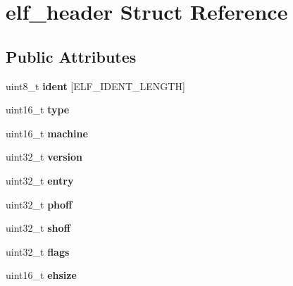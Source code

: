 \hypertarget{structelf__header}{}\section{elf\+\_\+header Struct Reference}
\label{structelf__header}
\subsection*{Public Attributes}
\begin{DoxyCompactItemize}
\item 
\mbox{\label{structelf__header_aa62466724f7e6fb4794f1863f15595bb}} 
uint8\+\_\+t {\bfseries ident} \mbox{[}E\+L\+F\+\_\+\+I\+D\+E\+N\+T\+\_\+\+L\+E\+N\+G\+TH\mbox{]}
\item 
\mbox{\label{structelf__header_a6af0b35d508659d27f60d21821cfb6da}} 
uint16\+\_\+t {\bfseries type}
\item 
\mbox{\label{structelf__header_a7bc34a70eaa449a330edfeef0d5708ce}} 
uint16\+\_\+t {\bfseries machine}
\item 
\mbox{\label{structelf__header_a8bd4439963c52b6f1fda03ca00c3c1b4}} 
uint32\+\_\+t {\bfseries version}
\item 
\mbox{\label{structelf__header_abb5285fc4a3d3c57636f46aa570a2444}} 
uint32\+\_\+t {\bfseries entry}
\item 
\mbox{\label{structelf__header_aa1a016e031867990ef61de1369c76db1}} 
uint32\+\_\+t {\bfseries phoff}
\item 
\mbox{\label{structelf__header_a70b9ecc0d6c5207eaf92401b01cb7bc6}} 
uint32\+\_\+t {\bfseries shoff}
\item 
\mbox{\label{structelf__header_afb73ec6332a8124c0bead52902846963}} 
uint32\+\_\+t {\bfseries flags}
\item 
\mbox{\label{structelf__header_acba1ebf45252772149ac8bf97f5e67b5}} 
uint16\+\_\+t {\bfseries ehsize}
\item 
\mbox{\label{structelf__header_aff8de5222e770da47e1b0e6456d1e689}} 

\end{DoxyCompactItemize}
